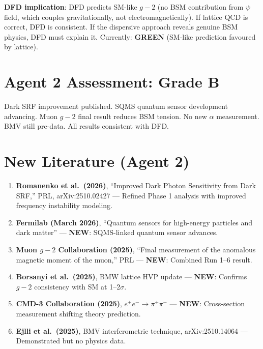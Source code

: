 \documentclass[11pt,a4paper]{article}
\newcommand{\GREEN}{\textcolor{dfdgreen}{\textbf{GREEN}}}
\newcommand{\NEW}{\textcolor{dfdblue}{\textbf{NEW}}}
\begin{document}
\textbf{DFD implication}: DFD predicts SM-like $g-2$ (no BSM contribution from $\psi$ field, which couples gravitationally, not electromagnetically). If lattice QCD is correct, DFD is consistent. If the dispersive approach reveals genuine BSM physics, DFD must explain it. Currently: \GREEN{} (SM-like prediction favoured by lattice).

\section{Agent 2 Assessment: Grade B}

Dark SRF improvement published. SQMS quantum sensor development advancing. Muon $g-2$ final result reduces BSM tension. No new $\alpha$ measurement. BMV still pre-data. All results consistent with DFD.

\section{New Literature (Agent 2)}

\begin{enumerate}
\item \textbf{Romanenko et al.\ (2026)}, ``Improved Dark Photon Sensitivity from Dark SRF,'' PRL, arXiv:2510.02427 --- Refined Phase 1 analysis with improved frequency instability modeling.

\item \textbf{Fermilab (March 2026)}, ``Quantum sensors for high-energy particles and dark matter'' --- \NEW: SQMS-linked quantum sensor advances.

\item \textbf{Muon $g-2$ Collaboration (2025)}, ``Final measurement of the anomalous magnetic moment of the muon,'' PRL --- \NEW: Combined Run 1--6 result.

\item \textbf{Borsanyi et al.\ (2025)}, BMW lattice HVP update --- \NEW: Confirms $g-2$ consistency with SM at 1--2$\sigma$.

\item \textbf{CMD-3 Collaboration (2025)}, $e^+e^- \to \pi^+\pi^-$ --- \NEW: Cross-section measurement shifting theory prediction.

\item \textbf{Ejlli et al.\ (2025)}, BMV interferometric technique, arXiv:2510.14064 --- Demonstrated but no physics data.
\end{enumerate}


\end{document}
